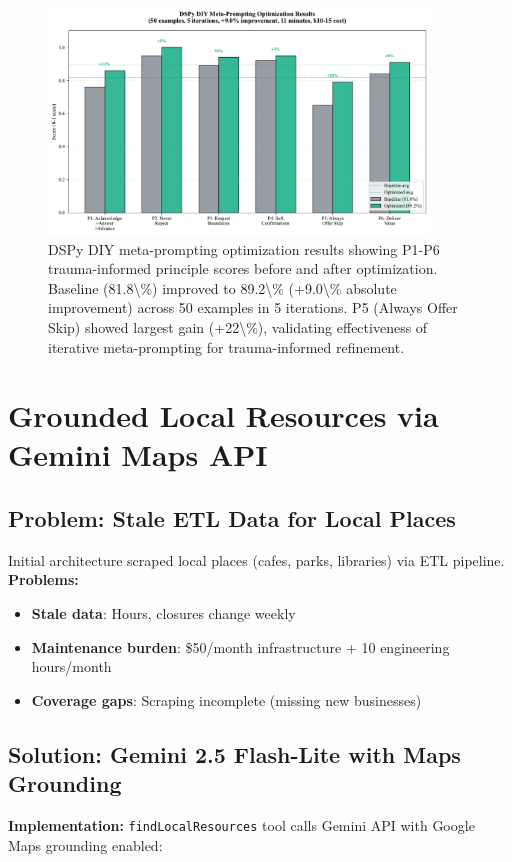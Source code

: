 \documentclass{article}%
\begin{document}
%
\begin{figure}[htbp]%
\centering%
\includegraphics[width=0.9\textwidth]{fig10_dspy_optimization.pdf}%
\caption{DSPy DIY meta-prompting optimization results showing P1-P6 trauma-informed principle scores before and after optimization. Baseline (81.8\textbackslash{}\%) improved to 89.2\textbackslash{}\% (+9.0\textbackslash{}\% absolute improvement) across 50 examples in 5 iterations. P5 (Always Offer Skip) showed largest gain (+22\textbackslash{}\%), validating effectiveness of iterative meta-prompting for trauma-informed refinement.}%
\label{fig:dspy}%
\end{figure}%
\section{Grounded Local Resources via Gemini Maps API}%
\label{sec:GroundedLocalResourcesviaGeminiMapsAPI}%
%
\subsection{Problem: Stale ETL Data for Local Places}%
\label{subsec:ProblemStaleETLDataforLocalPlaces}%
Initial architecture scraped local places (cafes, parks, libraries) via ETL pipeline. \textbf{Problems:}
\begin{itemize}
    \item \textbf{Stale data}: Hours, closures change weekly
    \item \textbf{Maintenance burden}: \$50/month infrastructure + 10 engineering hours/month
    \item \textbf{Coverage gaps}: Scraping incomplete (missing new businesses)
\end{itemize}

%
\subsection{Solution: Gemini 2.5 Flash{-}Lite with Maps Grounding}%
\label{subsec:SolutionGemini2.5Flash{-}LitewithMapsGrounding}%
\textbf{Implementation:} \texttt{findLocalResources} tool calls Gemini API with Google Maps grounding enabled:
\end{document}
